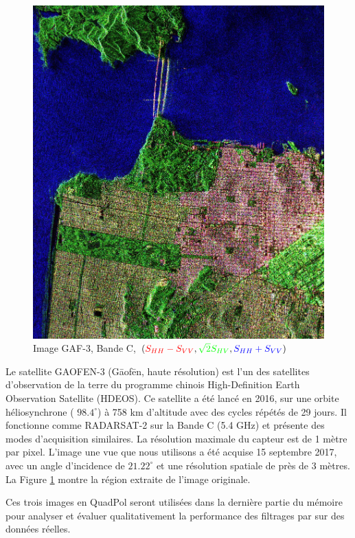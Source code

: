 \begin{figure}
  \includegraphics[width=1.0\linewidth]{figures/Chap4/GAF3-T3_RGB_reh.jpg}
  \centering
  \caption{
  \small{Image GAF-3, Bande C, $(\textcolor{red}{S_{HH}-S_{VV}}, \textcolor{green}{\sqrt{2}S_{HV}}, \textcolor{blue}{S_{HH}+S_{VV}})$}
  }
  \label{fig:sanfrancisco-gaf3-diagram}
\end{figure}

Le satellite GAOFEN-3 (Gāofēn, haute résolution) est l'un des satellites d'observation de la terre du programme chinois High-Definition Earth Observation Satellite (HDEOS).  Ce satellite a été lancé en 2016, sur une orbite  héliosynchrone ( $98.4^\circ$) à 758 km d'altitude avec des cycles répétés de 29 jours. Il fonctionne comme RADARSAT-2 sur la Bande C (5.4 GHz) et présente des modes d'acquisition similaires.  La résolution maximale du capteur est de 1 mètre par pixel.  L'image une vue que nous utilisons a été acquise 15 septembre 2017, avec un angle d'incidence de $21.22^{\circ}$ et une résolution spatiale de près de 3 mètres.  La Figure \ref{fig:sanfrancisco-gaf3-diagram} montre la région extraite de l'image originale.

Ces trois images en QuadPol seront utilisées dans la dernière partie du mémoire pour analyser et évaluer qualitativement la performance des filtrages par \acrconvnet sur des données réelles.

